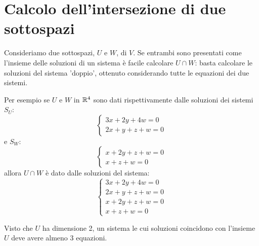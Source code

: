 \section{Calcolo dell'intersezione di due sottospazi}
Consideriamo due sottospazi, $U$ e $W$, di $V$. Se entrambi sono presentati
come l'insieme delle soluzioni di un sistema è facile calcolare $U \cap W$:
basta calcolare le soluzioni del sistema 'doppio', ottenuto considerando tutte
le equazioni dei due sistemi.

Per esempio se $U$ e $W$ in $\mathbb{R}^4$ sono dati rispettivamente dalle
soluzioni dei sistemi $S_U$:
\[
	\begin{cases}
		3x + 2y + 4w = 0 \\
		2x + y + z + w = 0
	\end{cases}
\]
e $S_W$:
\[
	\begin{cases}
		x + 2y + z + w = 0 \\
		x + z + w = 0
	\end{cases}
\]
allora $U \cap W$ è dato dalle soluzioni del sistema:
\[
	\begin{cases}
		3x + 2y + 4w = 0   \\
		2x + y + z + w = 0 \\
		x + 2y + z + w = 0 \\
		x + z + w = 0
	\end{cases}
\]

\begin{observation}
	Visto che $U$ ha dimensione 2, un sistema le cui soluzioni coincidono con
	l'insieme $U$ deve avere almeno 3 equazioni.
\end{observation}

